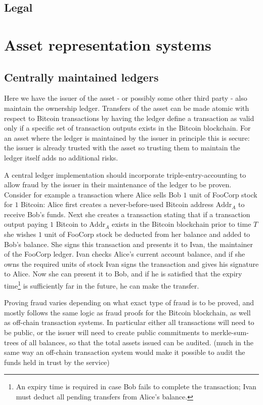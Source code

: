 \documentclass{article}
\begin{document}
\subsection{Legal}



\section{Asset representation systems}

\subsection{Centrally maintained ledgers}

Here we have the issuer of the asset - or possibly some other third party -
also maintain the ownership ledger. Transfers of the asset can be made atomic
with respect to Bitcoin transactions by having the ledger define a transaction
as valid only if a specific set of transaction outputs exists in the Bitcoin
blockchain. For an asset where the ledger is maintained by the issuer in
principle this is secure: the issuer is already trusted with the asset so
trusting them to maintain the ledger itself adds no additional risks.

A central ledger implementation should incorporate triple-entry-accounting
\cite{triple-entry-accounting} to allow fraud by the issuer in their
maintenance of the ledger to be proven. Consider for example a transaction
where Alice sells Bob $1$ unit of FooCorp stock for $1$ Bitcoin: Alice first
creates a never-before-used Bitcoin address $\mathrm{Addr}_A$ to receive Bob's
funds. Next she creates a transaction stating that if a transaction output
paying $1$ Bitcoin to $\mathrm{Addr}_A$ exists in the Bitcoin blockchain prior
to time $T$ she wishes $1$ unit of FooCorp stock be deducted from her balance
and added to Bob's balance. She signs this transaction and presents it to Ivan,
the maintainer of the FooCorp ledger. Ivan checks Alice's current account
balance, and if she owns the required units of stock Ivan signs the transaction
and gives his signature to Alice. Now she can present it to Bob, and if he is
satisfied that the expiry time\footnote{An expiry time is required in case Bob
fails to complete the transaction; Ivan must deduct all pending transfers from
Alice's balance.} is sufficiently far in the future, he can make the transfer.

Proving fraud varies depending on what exact type of fraud is to be proved, and
mostly follows the same logic as fraud proofs for the Bitcoin
blockchain,\cite{inflation-proofing-via-fraud-notices} as well as off-chain
transaction systems. In particular either all transactions will need to be
public, or the issuer will need to create public commitments to
merkle-sum-trees\cite{merkle-sum-tree} of all balances, so that the total
assets issued can be audited. (much in the same way an off-chain transaction
system would make it possible to audit the funds held in trust by the service)
\end{document}
